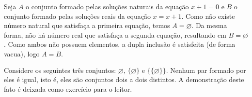 \begin{exemplo}
    \label{ex:igualdade_trivial_vazio}
    Seja \(A\) o conjunto formado pelas soluções naturais da equação \(x + 1 = 0\) e \(B\) o conjunto formado pelas soluções reais da equação \(x = x + 1\). Como não existe número natural que satisfaça a primeira equação, temos \(A = \varnothing\). Da mesma forma, não há número real que satisfaça a segunda equação, resultando em \(B = \varnothing\). Como ambos não possuem elementos, a dupla inclusão é satisfeita (de forma vacua), logo \(A = B\).
\end{exemplo}

\begin{exemplo}
    \label{ex:distincao_vazios_aninhados}
    Considere os seguintes três conjuntos: \(\varnothing\), \(\{\varnothing\}\) e \(\{\{\varnothing\}\}\). Nenhum par formado por eles é igual, isto é, eles são conjuntos dois a dois distintos. A demonstração deste fato é deixada como exercício para o leitor.
\end{exemplo}






